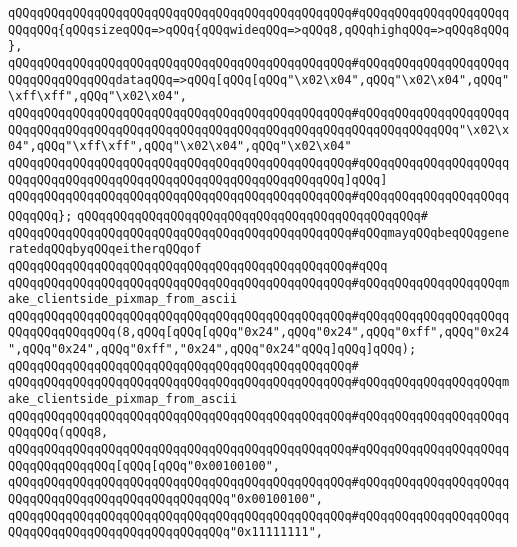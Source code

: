 \verb|qQQqqQQqqQQqqQQqqQQqqQQqqQQqqQQqqQQqqQQqqQQqqQQq#qQQqqQQqqQQqqQQqqQQqqQQqqQQq{qQQqsizeqQQq=>qQQq{qQQqwideqQQq=>qQQq8,qQQqhighqQQq=>qQQq8qQQq},|\newline
\verb|qQQqqQQqqQQqqQQqqQQqqQQqqQQqqQQqqQQqqQQqqQQqqQQq#qQQqqQQqqQQqqQQqqQQqqQQqqQQqqQQqqQQqdataqQQq=>qQQq[qQQq[qQQq"\x02\x04",qQQq"\x02\x04",qQQq"\xff\xff",qQQq"\x02\x04",|\newline
\verb|qQQqqQQqqQQqqQQqqQQqqQQqqQQqqQQqqQQqqQQqqQQqqQQq#qQQqqQQqqQQqqQQqqQQqqQQqqQQqqQQqqQQqqQQqqQQqqQQqqQQqqQQqqQQqqQQqqQQqqQQqqQQqqQQqqQQq"\x02\x04",qQQq"\xff\xff",qQQq"\x02\x04",qQQq"\x02\x04"|\newline
\verb|qQQqqQQqqQQqqQQqqQQqqQQqqQQqqQQqqQQqqQQqqQQqqQQq#qQQqqQQqqQQqqQQqqQQqqQQqqQQqqQQqqQQqqQQqqQQqqQQqqQQqqQQqqQQqqQQqqQQq]qQQq]|\newline
\verb|qQQqqQQqqQQqqQQqqQQqqQQqqQQqqQQqqQQqqQQqqQQqqQQq#qQQqqQQqqQQqqQQqqQQqqQQqqQQq};|\newline
\verb|qQQqqQQqqQQqqQQqqQQqqQQqqQQqqQQqqQQqqQQqqQQqqQQq#|\newline
\verb|qQQqqQQqqQQqqQQqqQQqqQQqqQQqqQQqqQQqqQQqqQQqqQQq#qQQqmayqQQqbeqQQqgeneratedqQQqbyqQQqeitherqQQqof|\newline
\verb|qQQqqQQqqQQqqQQqqQQqqQQqqQQqqQQqqQQqqQQqqQQqqQQq#qQQq|\newline
\verb|qQQqqQQqqQQqqQQqqQQqqQQqqQQqqQQqqQQqqQQqqQQqqQQq#qQQqqQQqqQQqqQQqqQQqmake_clientside_pixmap_from_ascii|\newline
\verb|qQQqqQQqqQQqqQQqqQQqqQQqqQQqqQQqqQQqqQQqqQQqqQQq#qQQqqQQqqQQqqQQqqQQqqQQqqQQqqQQqqQQq(8,qQQq[qQQq[qQQq"0x24",qQQq"0x24",qQQq"0xff",qQQq"0x24",qQQq"0x24",qQQq"0xff","0x24",qQQq"0x24"qQQq]qQQq]qQQq);|\newline
\verb|qQQqqQQqqQQqqQQqqQQqqQQqqQQqqQQqqQQqqQQqqQQqqQQq#|\newline
\verb|qQQqqQQqqQQqqQQqqQQqqQQqqQQqqQQqqQQqqQQqqQQqqQQq#qQQqqQQqqQQqqQQqqQQqmake_clientside_pixmap_from_ascii|\newline
\verb|qQQqqQQqqQQqqQQqqQQqqQQqqQQqqQQqqQQqqQQqqQQqqQQq#qQQqqQQqqQQqqQQqqQQqqQQqqQQq(qQQq8,|\newline
\verb|qQQqqQQqqQQqqQQqqQQqqQQqqQQqqQQqqQQqqQQqqQQqqQQq#qQQqqQQqqQQqqQQqqQQqqQQqqQQqqQQqqQQq[qQQq[qQQq"0x00100100",|\newline
\verb|qQQqqQQqqQQqqQQqqQQqqQQqqQQqqQQqqQQqqQQqqQQqqQQq#qQQqqQQqqQQqqQQqqQQqqQQqqQQqqQQqqQQqqQQqqQQqqQQqqQQq"0x00100100",|\newline
\verb|qQQqqQQqqQQqqQQqqQQqqQQqqQQqqQQqqQQqqQQqqQQqqQQq#qQQqqQQqqQQqqQQqqQQqqQQqqQQqqQQqqQQqqQQqqQQqqQQqqQQq"0x11111111",|\newline
